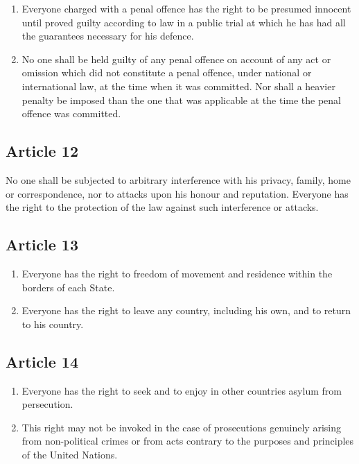 \documentclass[
  ngerman,
  american,
  titlepage,
  openright,
  DIV=calc,
  toc=listof,
  listof=nochaptergap]{scrbook}
\begin{document}
\begin{enumerate}
\def\labelenumi{\arabic{enumi}.}
\item
  Everyone charged with a penal offence has the right to be presumed
  innocent until proved guilty according to law in a public trial at
  which he has had all the guarantees necessary for his defence.
\item
  No one shall be held guilty of any penal offence on account of any act
  or omission which did not constitute a penal offence, under national
  or international law, at the time when it was committed. Nor shall a
  heavier penalty be imposed than the one that was applicable at the
  time the penal offence was committed.
\end{enumerate}

\subsection{Article 12}\label{article-12}

No one shall be subjected to arbitrary interference with his privacy,
family, home or correspondence, nor to attacks upon his honour and
reputation. Everyone has the right to the protection of the law against
such interference or attacks.

\subsection{Article 13}\label{article-13}

\begin{enumerate}
\def\labelenumi{\arabic{enumi}.}
\item
  Everyone has the right to freedom of movement and residence within the
  borders of each State.
\item
  Everyone has the right to leave any country, including his own, and to
  return to his country.
\end{enumerate}

\subsection{Article 14}\label{article-14}

\begin{enumerate}
\def\labelenumi{\arabic{enumi}.}
\item
  Everyone has the right to seek and to enjoy in other countries asylum
  from persecution.
\item
  This right may not be invoked in the case of prosecutions genuinely
  arising from non-political crimes or from acts contrary to the
  purposes and principles of the United Nations.
\end{enumerate}
\end{document}
